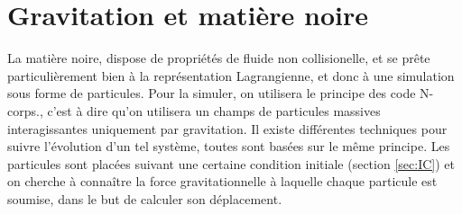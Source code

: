 

%
%

%
%


\section{Gravitation et matière noire}
\label{sec:solverDM}

La matière noire, dispose de propriétés de fluide non collisionelle, et se prête particulièrement bien à la représentation Lagrangienne, et donc à une simulation sous forme de particules.
Pour la simuler, on utilisera le principe des code N-corps., c'est à dire qu'on utilisera un champs de particules massives interagissantes uniquement par gravitation.
Il existe différentes techniques pour suivre l'évolution d'un tel système, toutes sont basées sur le même principe.
Les particules sont placées suivant une certaine condition initiale (section \ref{sec:IC}) et on cherche à connaître la force gravitationnelle à laquelle chaque particule est soumise, dans le but de calculer son déplacement.




